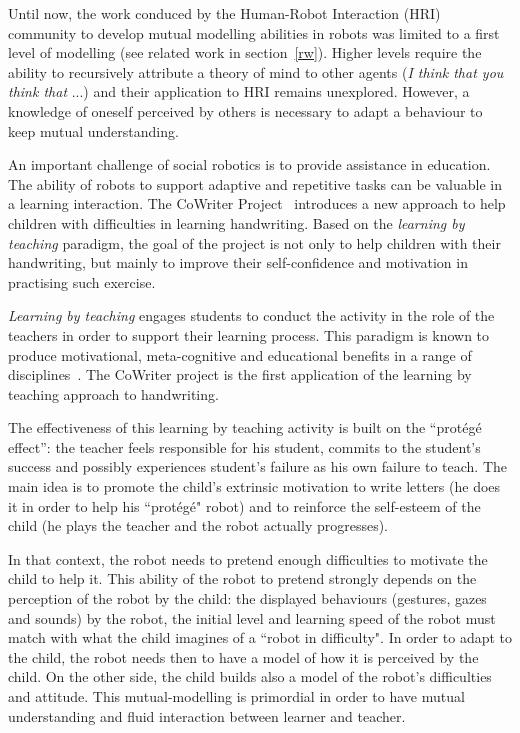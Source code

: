 \documentclass[conference]{IEEEtran}
\begin{document}
Until now, the work conduced by the Human-Robot Interaction (HRI) community to develop mutual modelling abilities in robots was limited to a first level of modelling (see related work in section~\ref{rw}). Higher levels require the ability to recursively attribute a theory of mind to other agents (\textit{I think that you think that} ...) and their application to HRI remains unexplored. However, a knowledge of oneself perceived by others is necessary to adapt a behaviour to keep mutual understanding. 


An important challenge of social robotics is to provide assistance in education. 
The ability of robots to support adaptive and repetitive tasks can be valuable in a learning interaction.
The CoWriter Project~\cite{Hood,jacq2016building} introduces a new approach to help children with difficulties in learning handwriting. 
Based on the \emph{learning by teaching} paradigm, the goal of the project is not only to help children with their handwriting, but mainly to improve their self-confidence and motivation in practising such exercise.

\emph{Learning by teaching} engages students to conduct the activity in the role of the teachers in order to support their learning process. 
This  paradigm is known to produce motivational, meta-cognitive and educational benefits in a range of disciplines~\cite{Rohrbeck2003}. 
The CoWriter project is the first application of the learning by teaching approach to handwriting.

The effectiveness of this learning by teaching activity is built on the ``prot\'eg\'e effect'': the teacher feels responsible for his student, commits to the student's success and possibly experiences student's failure as his own failure to teach. 
The main idea is to promote the child's extrinsic motivation to write letters (he does it in order to help his ``prot\'eg\'e" robot) and to reinforce the self-esteem of the child (he plays the teacher and the robot actually progresses).

In that context, the robot needs to pretend enough difficulties to motivate the child to help it. 
This ability of the robot to pretend strongly depends on the perception of the robot by the child: the displayed behaviours (gestures, gazes and sounds) by the robot, the initial level and learning speed of the robot must match with what the child imagines of a ``robot in difficulty".
In order to adapt to the child, the robot needs then to have a model of how it is perceived by the child. On the other side, the child builds also a model of the robot's difficulties and attitude. 
This mutual-modelling is primordial in order to have mutual understanding and fluid interaction between learner and teacher. 
\end{document}
